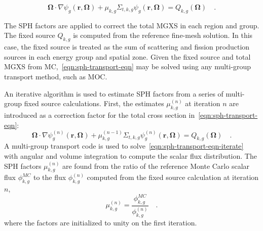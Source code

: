\begin{dmath}
\label{eqn:sph-transport-eqn}
\mathbf{\Omega} \cdot \nabla \psi_{g}(\mathbf{r},\mathbf{\Omega}) + \mu_{k,g}\Sigma_{t,k,g}\psi_{g}(\mathbf{r},\mathbf{\Omega}) = Q_{k,g}(\mathbf{\Omega}) \quad .
\end{dmath}

The SPH factors are applied to correct the total MGXS in each region and group. The fixed source $Q_{k,g}$ is computed from the reference fine-mesh solution. In this case, the fixed source is treated as the sum of scattering and fission production sources in each energy group and spatial zone. Given the fixed source and total MGXS from MC,~\autoref{eqn:sph-transport-eqn} may be solved using any multi-group transport method, such as MOC.




An iterative algorithm is used to estimate SPH factors from a series of multi-group fixed source calculations. First, the estimates $\mu_{k,g}^{(n)}$ at iteration $n$ are introduced as a correction factor for the total cross section in~\autoref{eqn:sph-transport-eqn}:
%
\begin{dmath}
\label{eqn:sph-transport-eqn-iterate}
\mathbf{\Omega} \cdot \nabla \psi_{g}^{(n)}(\mathbf{r},\mathbf{\Omega}) + \mu_{k,g}^{(n-1)}\Sigma_{t,k,g}\psi_{g}^{(n)}(\mathbf{r},\mathbf{\Omega}) = Q_{k,g}(\mathbf{\Omega}) \quad .
\end{dmath}
%
A multi-group transport code is used to solve~\autoref{eqn:sph-transport-eqn-iterate} with angular and volume integration to compute the scalar flux distribution. The SPH factors $\mu_{k,g}^{(n)}$ are found from the ratio of the reference Monte Carlo scalar flux $\phi_{k,g}^{MC}$ to the flux $\phi_{k,g}^{(n)}$ computed from the fixed source calculation at iteration $n$,
%
\begin{dmath}
\label{eqn:sph-update}
\mu_{k,g}^{(n)} = \frac{\phi_{k,g}^{MC}}{\phi_{k,g}^{(n)}} \quad .
\end{dmath}
%
where the factors are initialized to unity on the first iteration.

